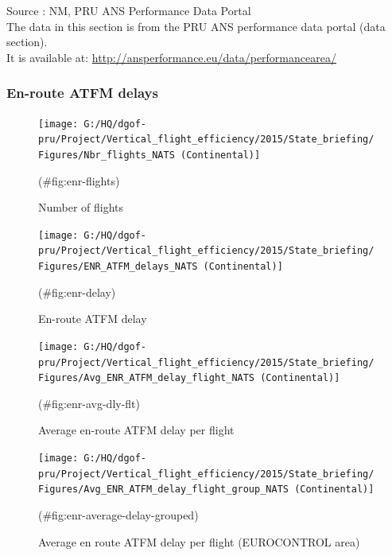 \documentclass[]{article}
\begin{document}
Source : NM, PRU ANS Performance Data Portal\\
The data in this section is from the PRU ANS performance data portal (data section).\\
It is available at: \url{http://ansperformance.eu/data/performancearea/}

\hypertarget{en-route-atfm-delays-1}{%
\subsubsection{En-route ATFM delays}\label{en-route-atfm-delays-1}}

\begin{figure}

{\centering \texttt{[image: G:/HQ/dgof-pru/Project/Vertical\_flight\_efficiency/2015/State\_briefing/Figures/Nbr\_flights\_NATS (Continental)]} 

}

\caption{Number of flights}(\#fig:enr-flights)
\end{figure}

\begin{figure}

{\centering \texttt{[image: G:/HQ/dgof-pru/Project/Vertical\_flight\_efficiency/2015/State\_briefing/Figures/ENR\_ATFM\_delays\_NATS (Continental)]} 

}

\caption{En-route ATFM delay}(\#fig:enr-delay)
\end{figure}

\begin{figure}

{\centering \texttt{[image: G:/HQ/dgof-pru/Project/Vertical\_flight\_efficiency/2015/State\_briefing/Figures/Avg\_ENR\_ATFM\_delay\_flight\_NATS (Continental)]} 

}

\caption{Average en-route ATFM delay per flight}(\#fig:enr-avg-dly-flt)
\end{figure}

\begin{figure}

{\centering \texttt{[image: G:/HQ/dgof-pru/Project/Vertical\_flight\_efficiency/2015/State\_briefing/Figures/Avg\_ENR\_ATFM\_delay\_flight\_group\_NATS (Continental)]} 

}

\caption{Average en route ATFM delay per flight (EUROCONTROL area)}(\#fig:enr-average-delay-grouped)
\end{figure}
\end{document}

